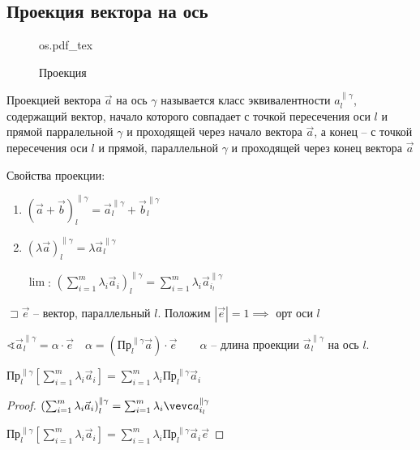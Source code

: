 \documentclass{book}
\theoremstyle{definition}
\newcommand{\incfig}[1]{%
    \def\svgwidth{\columnwidth}
    {#1.pdf_tex}
}
\begin{document}
        \subsection{Проекция вектора на ось}

\begin{figure}[ht]
    \centering
    \incfig{os}
    \caption{Проекция}
    \label{fig:os}
\end{figure}


\begin{definition}
    Проекцией вектора $\vec a$ на ось  $\gamma$ называется класс эквивалентности $a_l^{\parallel \gamma}$, содержащий вектор, начало которого совпадает с точкой пересечения оси  $l$ и прямой парралельной $\gamma$ и проходящей через начало вектора $\vec a$, а конец -- с точкой пересечения оси $l$ и прямой, параллельной  $\gamma$ и проходящей через конец вектора  $\vec a$
\end{definition}

Свойства проекции:
\begin{enumerate}
    \item $(\vec a + \vec b)_l^{\parallel \gamma} = \vec a_l^{\parallel \gamma} + \vec b_l^{\parallel \gamma}$
    \item  $(\lambda \vec a)_l^{\parallel \gamma} = \lambda \vec a_l^{\parallel \gamma}$
    \item [\underline{$\lim$}:]  $\left( \sum\limits_{i=1}^{m} \lambda_i\vec a_i \right)_l^{\parallel \gamma} = \sum\limits_{i=1}^{m} \lambda_i \vec a_{i_l}^{\parallel \gamma} $

\end{enumerate}

$\sqsupset \vec e$ -- вектор, параллельный $l$. Положим  $\left| \vec e \right| = 1 \implies  $ орт оси $l$

$\sphericalangle \vec a_l^{\parallel \gamma} = \alpha \cdot \vec e\quad \alpha = (\text{Пр}_l^{\parallel \gamma}\vec a) \cdot  \vec e\qquad \alpha$ -- длина проекции $\vec a_l^{\parallel \gamma}$ на ось  $l$.

\begin{lemma}
$\text{Пр}_l^{\parallel \gamma} \left[ \sum_{i=1}^{m} \lambda_i \vec a_i \right] = \sum_{i=1}^{m} \lambda_i \text{Пр}_l^{\parallel \gamma} \vec a_i$
\end{lemma}
\begin{proof}
    $\left( \sum_{i=1}^{m} \lambda_i \vec a_i \right) _l^{\parallel \gamma} = \sum_{i=1}^{m} \lambda_i \vevc a_{i_l}^{\parallel \gamma}$

    $\text{Пр}_l^{\parallel \gamma}\left[\sum_{i=1}^{m} \lambda_i \vec a_i\right] = \sum_{i=1}^{m} \lambda _i \text{Пр}_l^{\parallel \gamma} \vec a_i \vec e $
\end{proof}
\end{document}
